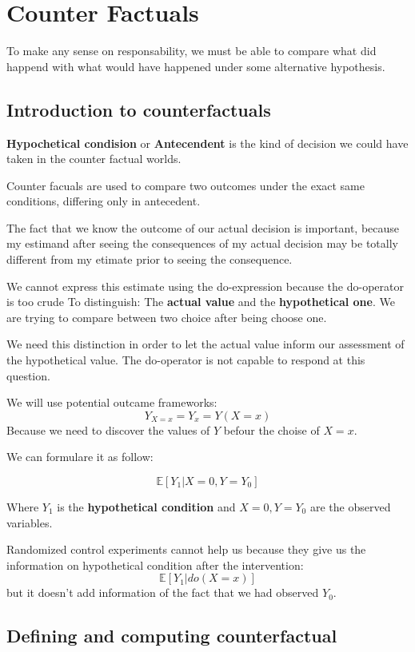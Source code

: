 \chapter{Counter Factuals}
To make any sense on responsability, we must be able to compare what did happend
with what would have happened under some alternative hypothesis.
\section{Introduction to counterfactuals}


\textbf{Hypochetical condision} or \textbf{Antecendent} is the kind of decision
we could have taken in the counter factual worlds.


Counter facuals are used to compare two outcomes under the exact same conditions,
differing only in antecedent.

The fact that we know the outcome of our actual decision is important, because my estimand
after seeing the consequences of my actual decision may be totally different from
my etimate prior to seeing the consequence.

We cannot express this estimate using the do-expression because the do-operator
is too crude To distinguish: The \textbf{actual value} and the \textbf{hypothetical one}.
We are trying to compare between two choice after being choose one.

We need this distinction in order to let the actual value inform our assessment
of the hypothetical value. The do-operator is not capable to respond at this question.

We will use potential outcame frameworks:
$$Y_{X=x} = Y_x = Y(X=x)$$
Because we need to discover the values of $Y$ befour the choise of $X=x$.


We can formulare it as follow:

$$\mathbb{E}[Y_1|X=0,Y=Y_0]$$

Where $Y_1$ is the \textbf{hypothetical condition} and $X=0,Y=Y_0$ are the observed
variables.

\begin{note}
    Randomized control experiments cannot help us because they give us the information
    on hypothetical condition after the intervention:
    $$\mathbb{E}[Y_1|do(X=x)]$$
    but it doesn't add information of the fact that we had observed $Y_0$.
\end{note}

\section{Defining and computing counterfactual}

